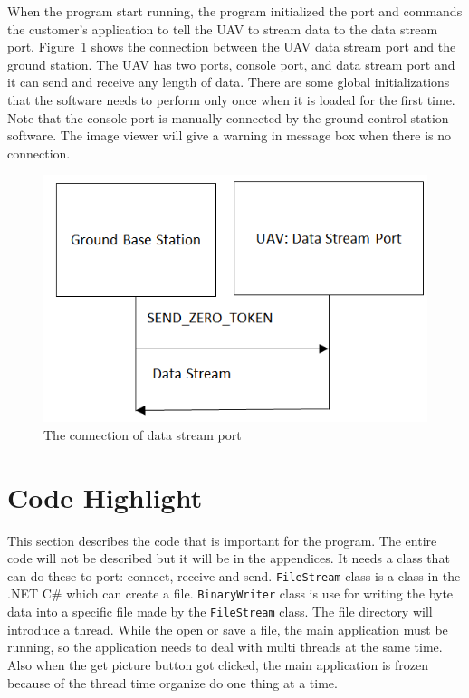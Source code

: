 When the program start running, the program initialized the port and commands the customer’s application to tell the UAV to stream data to the data stream port. Figure~\ref{GCS_connect_command} shows the connection between the UAV data stream port and the ground station. The UAV has two ports, console port, and data stream port and it can send and receive any length of data. There are some global initializations that the software needs to perform only once when it is loaded for the first time. Note that the console port is manually connected by the ground control station software. The image viewer will give a warning in message box when there is no connection.

\begin{figure}[!hbtp]
\begin{center}
\includegraphics[scale=0.5]{figures/connect_command.png} 
\end{center}
\caption{The connection of data stream port\label{GCS_connect_command}}
\end{figure}


 
\section{Code Highlight}

This section describes the code that is important for the program. The entire code will not be described but it will be in the appendices. It needs a class that can do these to port: connect, receive and send. \texttt{FileStream} class is a class in the .NET C\# which can create a file. \texttt{BinaryWriter} class is use for writing the byte data into a specific file made by the \texttt{FileStream} class. The file directory will introduce a thread. While the open or save a file, the main application must be running, so the application needs to deal with multi threads at the same time. Also when the get picture button got clicked, the main application is frozen because of the thread time organize do one thing at a time. 

